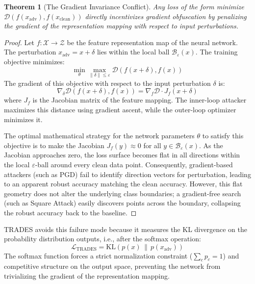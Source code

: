 \documentclass[12pt,a4paper]{article}
\newtheorem{theorem}{Theorem}[section]
\begin{document}
\begin{theorem}[The Gradient Invariance Conflict]
Any loss of the form minimize $\mathcal{D}(f(x_{\text{adv}}), f(x_{\text{clean}}))$ directly incentivizes gradient obfuscation by penalizing the gradient of the representation mapping with respect to input perturbations.
\end{theorem}

\begin{proof}
Let $f: \mathcal{X} \to \mathcal{Z}$ be the feature representation map of the neural network. The perturbation $x_{\text{adv}} = x + \delta$ lies within the local ball $\mathcal{B}_\varepsilon(x)$. The training objective minimizes:
\begin{equation}
\min_\theta \max_{\|\delta\| \le \varepsilon} \mathcal{D}(f(x + \delta), f(x))
\end{equation}
The gradient of this objective with respect to the input perturbation $\delta$ is:
\begin{equation}
\nabla_\delta \mathcal{D}(f(x + \delta), f(x)) = \nabla_f \mathcal{D} \cdot J_f(x + \delta)
\end{equation}
where $J_f$ is the Jacobian matrix of the feature mapping. The inner-loop attacker maximizes this distance using gradient ascent, while the outer-loop optimizer minimizes it. 

The optimal mathematical strategy for the network parameters $\theta$ to satisfy this objective is to make the Jacobian $J_f(y) \approx 0$ for all $y \in \mathcal{B}_\varepsilon(x)$. As the Jacobian approaches zero, the loss surface becomes flat in all directions within the local $\varepsilon$-ball around every clean data point. Consequently, gradient-based attackers (such as PGD) fail to identify direction vectors for perturbation, leading to an apparent robust accuracy matching the clean accuracy. However, this flat geometry does not alter the underlying class boundaries; a gradient-free search (such as Square Attack) easily discovers points across the boundary, collapsing the robust accuracy back to the baseline.
\end{proof}

TRADES avoids this failure mode because it measures the KL divergence on the probability distribution outputs, i.e., after the softmax operation:
\begin{equation}
\mathcal{L}_{\text{TRADES}} = \text{KL}(p(x) \,\|\, p(x_{\text{adv}}))
\end{equation}
The softmax function forces a strict normalization constraint ($\sum_c p_c = 1$) and competitive structure on the output space, preventing the network from trivializing the gradient of the representation mapping.
\end{document}
